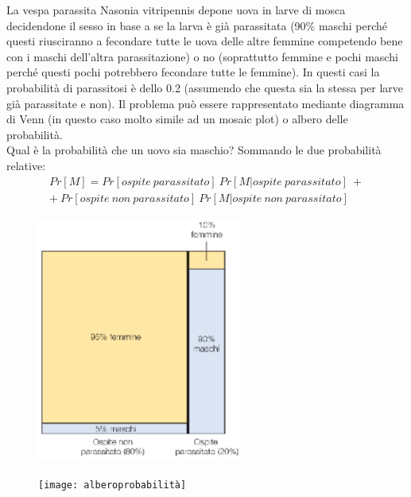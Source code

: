 \documentclass[10pt, draft]{book}
\newcounter{example}[section]
\begin{document}
\begin{example}
    La vespa parassita Nasonia vitripennis depone uova in larve di mosca decidendone il sesso in base a se la larva è già parassitata (90\% maschi perché questi riusciranno a fecondare tutte le uova delle altre femmine competendo bene con i maschi dell’altra parassitazione) o no (soprattutto femmine e pochi maschi perché questi pochi potrebbero fecondare tutte le femmine). In questi casi la probabilità di parassitosi è dello 0.2 (assumendo che questa sia la stessa per larve già parassitate e non). Il problema può essere rappresentato mediante diagramma di Venn (in questo caso molto simile ad un mosaic plot) o albero delle probabilità. 
    \\
    Qual è la probabilità che un uovo sia maschio? Sommando le due probabilità relative:
    \begin{equation}
        \begin{gathered}
            Pr[M]=Pr[ospite\ parassitato]\ Pr[M|ospite\ parassitato]\ + \\ +\ Pr[ospite\ non\ parassitato]\ Pr[M|ospite\ non\ parassitato]
        \end{gathered}
    \end{equation}
\end{example}
\begin{figure}[h]\label{fig5.8-1}
    \centering
    \includegraphics[width=0.6\textwidth]{fig5.8-1}
    \caption{\small{}}
\end{figure}
\begin{figure}[h]\label{alberoprobabilità}
    \centering
    \texttt{[image: alberoprobabilità]}
    \caption{\small{}}
\end{figure}
 
\end{document}
